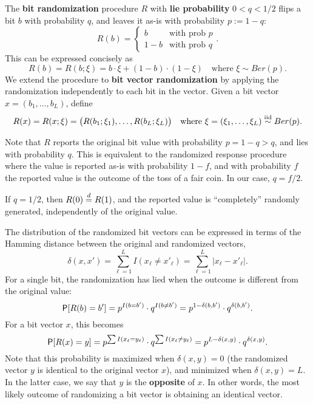 \documentclass[11pt,draft]{article}
\begin{document}
\begin{defn}
The \textbf{bit randomization} procedure $R$ with \textbf{lie probability} $0 < q < 1/2$ flips a bit $b$ with probability $q$, and leaves it as-is with probability $p := 1-q$:
\[ R(b) =
\begin{cases}
b & \text{with prob }p \\
1-b & \text{with prob }q
\end{cases}.
\]
This can be expressed concisely as
\[ R(b) = R(b; \xi) = b \cdot \xi + (1-b) \cdot (1-\xi)
\quad\text{where } \xi\sim Ber(p). \]
We extend the procedure to \textbf{bit vector randomization} by applying the randomization independently to each bit in the vector.
Given a bit vector $x = (b_1,\dots,b_L)$, define
\begin{equation}\label{eq:bitvecrand}
R(x) = R(x;\xi) = \big(R(b_1;\xi_1), \dots, R(b_L;\xi_L)\big)
\quad\text{where } \xi = (\xi_1,\dots,\xi_L) \iid Ber(p).
\end{equation}
\end{defn}

\begin{rmk}
Note that $R$ reports the original bit value with probability $p = 1-q > q$, and lies with probability $q$.
This is equivalent to the randomized response procedure where the value is reported as-is with probability $1-f$, and with probability $f$ the reported value is the outcome of the toss of a fair coin.
In our case, $q = f/2$.
\end{rmk}
\begin{rmk}
If $q = 1/2$, then $R(0)\eqdist R(1)$, and the reported value is ``completely'' randomly generated, \ie independently of the original value.
\end{rmk}


The distribution of the randomized bit vectors can be expressed in terms of
the Hamming distance between the original and randomized vectors,
\[ \delta(x,x') = \sum_{\ell = 1}^L I(x_\ell \neq x'_\ell)
= \sum_{\ell = 1}^L |x_\ell - x'_\ell|. \]
For a single bit, the randomization has lied when the outcome is different from the original value: 
\[ \P[R(b) = b'] = p^{I(b = b')}\cdot q^{I(b \neq b')}
= p^{1 - \delta(b,b')}\cdot q^{\delta(b,b')}. \]
For a bit vector $x$, this becomes
\[ \P[R(x) = y] = p^{\sum I(x_\ell = y_\ell)}\cdot 
q^{\sum I(x_\ell \neq y_\ell)}
= p^{L-\delta(x,y)}\cdot q^{\delta(x,y)}. \]
Note that this probability is maximized when $\delta(x,y) = 0$ (the randomized vector $y$ is identical to the original vector $x$), and minimized when $\delta(x,y) = L$.
In the latter case, we say that $y$ is the \textbf{opposite} of $x$.
In other words, the most likely outcome of randomizing a bit vector is obtaining an identical vector.
\end{document}
